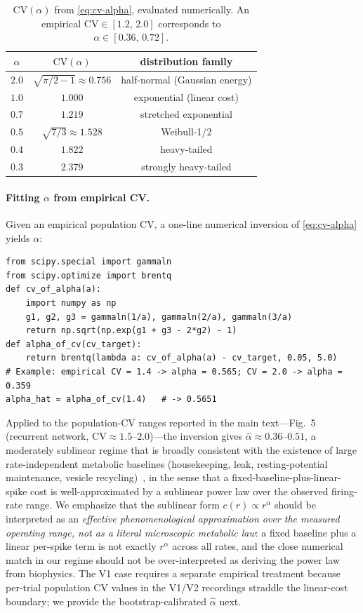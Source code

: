 \documentclass[11pt]{article}
\theoremstyle{remark}
\theoremstyle{definition}
\begin{document}
\begin{table}[h!]
\centering
\caption{$\mathrm{CV}(\alpha)$ from \eqref{eq:cv-alpha}, evaluated numerically.  An empirical $\mathrm{CV}\in[1.2,\,2.0]$ corresponds to $\alpha\in[0.36,\,0.72]$.}
\label{tab:alpha-cv}
\begin{tabular}{c|c|c}
$\alpha$ & $\mathrm{CV}(\alpha)$ & distribution family \\\hline
$2.0$ & $\sqrt{\pi/2 - 1}\approx 0.756$ & half-normal (Gaussian energy) \\
$1.0$ & $1.000$                          & exponential (linear cost) \\
$0.7$ & $1.219$                          & stretched exponential \\
$0.5$ & $\sqrt{7/3}\approx 1.528$        & Weibull-1/2 \\
$0.4$ & $1.822$                          & heavy-tailed \\
$0.3$ & $2.379$                          & strongly heavy-tailed \\
\end{tabular}
\end{table}

\paragraph{Fitting $\alpha$ from empirical CV.}
Given an empirical population CV, a one-line numerical inversion of \eqref{eq:cv-alpha} yields $\alpha$:
\begin{verbatim}
from scipy.special import gammaln
from scipy.optimize import brentq
def cv_of_alpha(a):
    import numpy as np
    g1, g2, g3 = gammaln(1/a), gammaln(2/a), gammaln(3/a)
    return np.sqrt(np.exp(g1 + g3 - 2*g2) - 1)
def alpha_of_cv(cv_target):
    return brentq(lambda a: cv_of_alpha(a) - cv_target, 0.05, 5.0)
# Example: empirical CV = 1.4 -> alpha = 0.565; CV = 2.0 -> alpha = 0.359
alpha_hat = alpha_of_cv(1.4)   # -> 0.5651
\end{verbatim}
Applied to the population-CV ranges reported in the main text---Fig.~5 (recurrent network, $\mathrm{CV}\approx 1.5$--$2.0$)---the inversion gives $\hat\alpha\approx 0.36$--$0.51$, a moderately sublinear regime that is broadly consistent with the existence of large rate-independent metabolic baselines (housekeeping, leak, resting-potential maintenance, vesicle recycling)~\cite{111,Harris2012,42}, in the sense that a fixed-baseline-plus-linear-spike cost is well-approximated by a sublinear power law over the observed firing-rate range.  We emphasize that the sublinear form $c(r)\propto r^\alpha$ should be interpreted as an \emph{effective phenomenological approximation over the measured operating range, not as a literal microscopic metabolic law}: a fixed baseline plus a linear per-spike term is not exactly $r^\alpha$ across all rates, and the close numerical match in our regime should not be over-interpreted as deriving the power law from biophysics.  The V1 case requires a separate empirical treatment because per-trial population CV values in the V1/V2 recordings straddle the linear-cost boundary; we provide the bootstrap-calibrated $\hat\alpha$ next.
\end{document}
